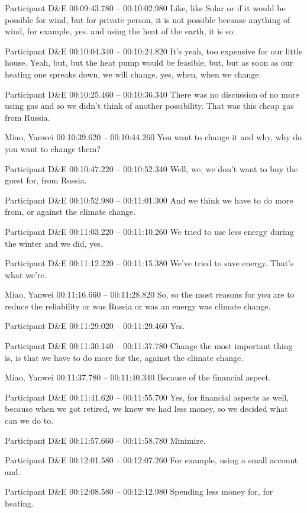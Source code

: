 {Participant D\&E 00:09:43.780 -- 00:10:02.980
Like, like Solar or if it would be possible for wind, but for private person, it is not possible because anything of wind, for example, yes. and using the heat of the earth, it is so.

Participant D\&E 00:10:04.340 -- 00:10:24.820
It's yeah, too expensive for our little house. Yeah, but, but the heat pump would be feasible, but, but as soon as our heating one spreaks down, we will change. yes, when, when we change.

Participant D\&E 00:10:25.460 -- 00:10:36.340
There was no discussion of no more using gas and so we didn't think of another possibility. That was this cheap gas from Russia.

Miao, Yanwei 00:10:39.620 -- 00:10:44.260
You want to change it and why, why do you want to change them?

Participant D\&E 00:10:47.220 -- 00:10:52.340
Well, we, we don't want to buy the guest for, from Russia.

Participant D\&E 00:10:52.980 -- 00:11:01.300
And we think we have to do more from, or against the climate change.

Participant D\&E 00:11:03.220 -- 00:11:10.260
We tried to use less energy during the winter and we did, yes.

Participant D\&E 00:11:12.220 -- 00:11:15.380
We've tried to save energy. That's what we're.

Miao, Yanwei 00:11:16.660 -- 00:11:28.820
So, so the most reasons for you are to reduce the reliability or was Russia or was an energy was climate change.

Participant D\&E 00:11:29.020 -- 00:11:29.460
Yes.

Participant D\&E 00:11:30.140 -- 00:11:37.780
Change the most important thing is, is that we have to do more for the, against the climate change.

Miao, Yanwei 00:11:37.780 -- 00:11:40.340
Because of the financial aspect.

Participant D\&E 00:11:41.620 -- 00:11:55.700
Yes, for financial aspects as well, because when we got retired, we knew we had less money, so we decided what can we do to.

Participant D\&E 00:11:57.660 -- 00:11:58.780
Minimize.

Participant D\&E 00:12:01.580 -- 00:12:07.260
For example, using a small account and.

Participant D\&E 00:12:08.580 -- 00:12:12.980
Spending less money for, for heating.

}
